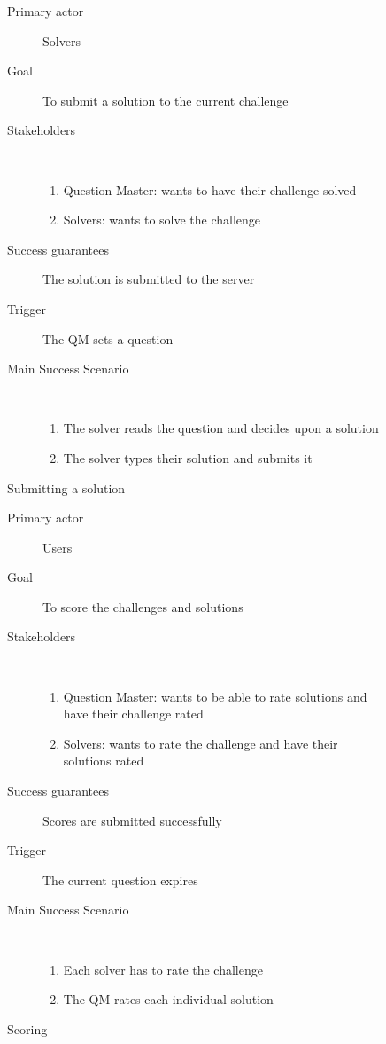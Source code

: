 \documentclass{report}
\begin{document}
{\begin{figure}[h]
\caption{Submitting a solution}
\begin{description}
\item[Primary actor] Solvers
\item[Goal] To submit a solution to the current challenge
\item[Stakeholders]~
\begin{enumerate}
\item Question Master: wants to have their challenge solved
\item Solvers: wants to solve the challenge
\end{enumerate}
\item[Success guarantees] The solution is submitted to the server
\item[Trigger] The QM sets a question
\item[Main Success Scenario]~
\begin{enumerate}
\item The solver reads the question and decides upon a solution
\item The solver types their solution and submits it
\end{enumerate}
\end{description}
\end{figure}

\begin{figure}[h]
\caption{Scoring}
\begin{description}
\item[Primary actor] Users
\item[Goal] To score the challenges and solutions
\item[Stakeholders]~
\begin{enumerate}
\item Question Master: wants to be able to rate solutions and have their challenge rated
\item Solvers: wants to rate the challenge and have their solutions rated
\end{enumerate}
\item[Success guarantees] Scores are submitted successfully
\item[Trigger] The current question expires
\item[Main Success Scenario]~
\begin{enumerate}
\item Each solver has to rate the challenge
\item The QM rates each individual solution
\end{enumerate}
\end{description}
\end{figure}
}
\end{document}

